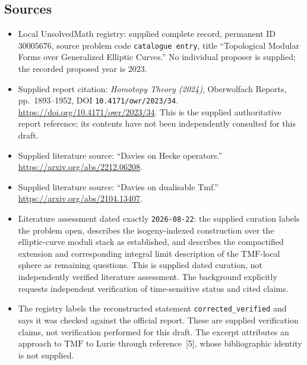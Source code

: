 \documentclass[11pt]{article}
\begin{document}
\subsection{Sources}
\begin{itemize}
\item Local UnsolvedMath registry: supplied complete record, permanent ID \(30005676\), source problem code \texttt{catalogue entry}, title ``Topological Modular Forms over Generalized Elliptic Curves.'' No individual proposer is supplied; the recorded proposed year is \(2023\).
\item Supplied report citation: \emph{Homotopy Theory (2024)}, Oberwolfach Reports, pp.~1893--1952, DOI \texttt{10.4171/owr/2023/34}. \url{https://doi.org/10.4171/owr/2023/34}. This is the supplied authoritative report reference; its contents have not been independently consulted for this draft.
\item Supplied literature source: ``Davies on Hecke operators.'' \url{https://arxiv.org/abs/2212.06208}.
\item Supplied literature source: ``Davies on dualisable Tmf.'' \url{https://arxiv.org/abs/2104.13407}.
\item Literature assessment dated exactly \texttt{2026-08-22}: the supplied curation labels the problem open, describes the isogeny-indexed construction over the elliptic-curve moduli stack as established, and describes the compactified extension and corresponding integral limit description of the \(\mathrm{TMF}\)-local sphere as remaining questions. This is supplied dated curation, not independently verified literature assessment. The background explicitly requests independent verification of time-sensitive status and cited claims.
\item The registry labels the reconstructed statement \texttt{corrected\_verified} and says it was checked against the official report. These are supplied verification claims, not verification performed for this draft. The excerpt attributes an approach to \(\mathrm{TMF}\) to Lurie through reference~[5], whose bibliographic identity is not supplied.
\end{itemize}
\end{document}
